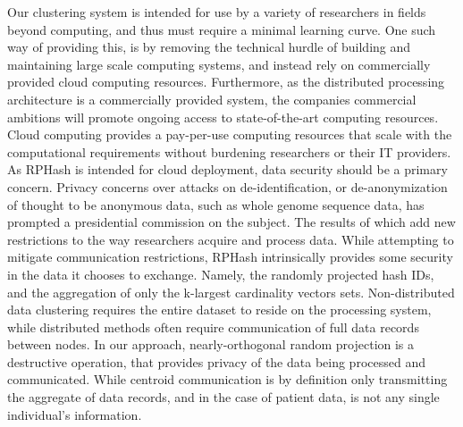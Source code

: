\documentclass[a4paper,10pt]{article}
\begin{document}
Our clustering system is intended for use by a variety of researchers in fields beyond
computing, and thus must require a minimal learning curve. One such way of
providing this, is by removing the technical hurdle of building and maintaining large
scale computing systems, and instead rely on commercially provided cloud computing
resources.
Furthermore, as the distributed processing architecture is
a commercially provided system, the companies commercial
ambitions will promote ongoing access to state-of-the-art computing
resources. Cloud computing provides a pay-per-use
computing resources that scale with the computational requirements 
without burdening researchers or their IT providers.\\

As RPHash is intended for cloud
deployment, data security should be a primary concern. 
Privacy concerns 
over attacks on de-identification, or de-anonymization\cite{deanon1}\cite{deanon2}
of thought to be anonymous data, such as  whole genome sequence data\cite{deident},
has prompted a presidential commission on the subject\cite{presidential}. The
results of which add new restrictions to the way researchers acquire and process data.
While attempting to mitigate communication restrictions, RPHash intrinsically provides some
security in the data it chooses to exchange. Namely, the randomly projected hash IDs, and
the aggregation of only the k-largest cardinality vectors sets.
 Non-distributed data clustering requires the
entire dataset to 
reside on the processing system, while distributed methods often require
communication of  full data records between
nodes. In our approach, nearly-orthogonal random projection is a destructive
operation, that
provides privacy of the data being processed and communicated. While centroid
communication is 
by definition only transmitting the aggregate of data records, and in the case
of patient data, is not any single individual's information.\\
\end{document}
